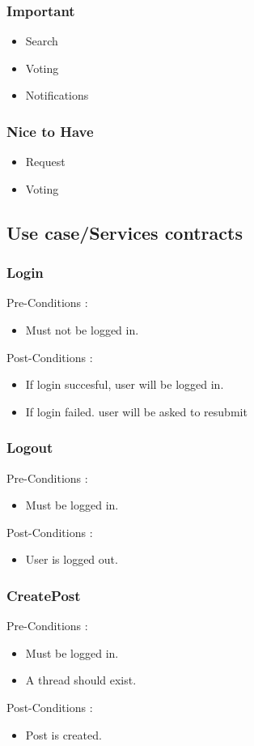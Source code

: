 \documentclass[12pt, oneside]{article}
\begin{document}
		\subsubsection{Important}
			\begin{itemize}
				\item Search
				\item Voting
				\item Notifications
			 \end{itemize}
		\subsubsection{Nice to Have}
			\begin{itemize}
				\item Request
				\item Voting
			 \end{itemize}
	\subsection{Use case/Services contracts}
			\subsubsection{Login}
				Pre-Conditions : \begin{itemize}
							\item Must not be logged in.
						     \end{itemize}
				Post-Conditions : \begin{itemize}
							\item If login succesful, user will be logged in.
							\item If login failed. user will be asked to resubmit
						     \end{itemize}
			\subsubsection{Logout}
				Pre-Conditions : \begin{itemize}
							\item Must be logged in.
						     \end{itemize}
				Post-Conditions : \begin{itemize}
							\item User is logged out.
						     \end{itemize}
			\subsubsection{CreatePost}
				Pre-Conditions : \begin{itemize}
							\item Must be logged in.
							\item A thread should exist.
						     \end{itemize}
				Post-Conditions : \begin{itemize}
							\item Post is created.
						     \end{itemize}
\end{document}
